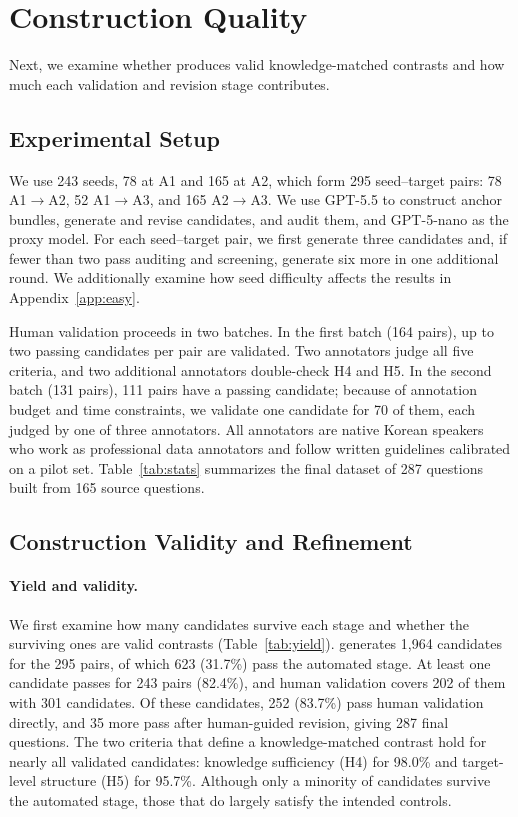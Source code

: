 \section{Construction Quality}
\label{sec:construction_quality}


% 
Next, we examine whether \name{} produces valid knowledge-matched contrasts and how much each validation and revision stage contributes.

\subsection{Experimental Setup}
\label{sec:construction_setup}

We use 243 seeds, 78 at A1 and 165 at A2, which form 295 seed--target pairs: 78 A1$\rightarrow$A2, 52 A1$\rightarrow$A3, and 165 A2$\rightarrow$A3.
We use GPT-5.5 to construct anchor bundles, generate and revise candidates, and audit them, and GPT-5-nano as the proxy model.
For each seed--target pair, we first generate three candidates and, if fewer than two pass auditing and screening, generate six more in one additional round.
We additionally examine how seed difficulty affects the results in Appendix~\ref{app:easy}.

Human validation proceeds in two batches.
In the first batch (164 pairs), up to two passing candidates per pair are validated.
Two annotators judge all five criteria, and two additional annotators double-check H4 and H5.
In the second batch (131 pairs), 111 pairs have a passing candidate; because of annotation budget and time constraints, we validate one candidate for 70 of them, each judged by one of three annotators. 
All annotators are native Korean speakers who work as professional data annotators and follow written guidelines calibrated on a pilot set.
Table~\ref{tab:stats} summarizes the final dataset of 287 questions built from 165 source questions.

\subsection{Construction Validity and Refinement}
\label{sec:construction_results}

\paragraph{Yield and validity.}
We first examine how many candidates survive each stage and whether the surviving ones are valid contrasts (Table~\ref{tab:yield}).
\name{} generates 1,964 candidates for the 295 pairs, of which 623 (31.7\%) pass the automated stage.
At least one candidate passes for 243 pairs (82.4\%), and human validation covers 202 of them with 301 candidates.
Of these candidates, 252 (83.7\%) pass human validation directly, and 35 more pass after human-guided revision, giving 287 final questions.
The two criteria that define a knowledge-matched contrast hold for nearly all validated candidates: knowledge sufficiency (H4) for 98.0\% and target-level structure (H5) for 95.7\%.
Although only a minority of candidates survive the automated stage, those that do largely satisfy the intended controls.

